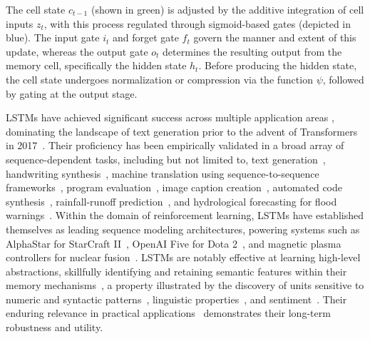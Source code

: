 The cell state $c_{t-1}$ (shown in green) is adjusted by the additive integration of cell inputs $z_t$, with this process regulated through sigmoid-based gates (depicted in blue). The input gate $i_t$ and forget gate $f_t$ govern the manner and extent of this update, whereas the output gate $o_t$ determines the resulting output from the memory cell, specifically the hidden state $h_t$. Before producing the hidden state, the cell state undergoes normalization or compression via the function $\psi$, followed by gating at the output stage.

LSTMs have achieved significant success across multiple application areas \citep{Hochreiter:01,Hochreiter:07,Schmidhuber:15}, dominating the landscape of text generation prior to the advent of Transformers in 2017~\citep{Vaswani:17}. Their proficiency has been empirically validated in a broad array of sequence-dependent tasks, including but not limited to, text generation~\citep{Graves:13,Karpathy:15blog}, handwriting synthesis~\citep{Graves:13}, machine translation using sequence-to-sequence frameworks~\citep{Sutskever:14nips}, program evaluation~\citep{Zaremba:14arxiv}, image caption creation~\citep{Karpathy:15,Hossain:19}, automated code synthesis~\citep{Karpathy:15blog}, rainfall-runoff prediction~\citep{Kratzert:18,Kratzert:19}, and hydrological forecasting for flood warnings~\citep{Nearing:24}. Within the domain of reinforcement learning, LSTMs have established themselves as leading sequence modeling architectures, powering systems such as AlphaStar for StarCraft II~\citep{Vinyals:17short}, OpenAI Five for Dota 2~\citep{OpenAI:19}, and magnetic plasma controllers for nuclear fusion~\citep{Degrave:22short}. LSTMs are notably effective at learning high-level abstractions, skillfully identifying and retaining semantic features within their memory mechanisms~\citep{Karpathy:15blog}, a property illustrated by the discovery of units sensitive to numeric and syntactic patterns~\citep{Lakretz:19}, linguistic properties~\citep{Bau:19}, and sentiment~\citep{Radford:17arxiv}. Their enduring relevance in practical applications~\citep{Degrave:22short,Nearing:24} demonstrates their long-term robustness and utility.

